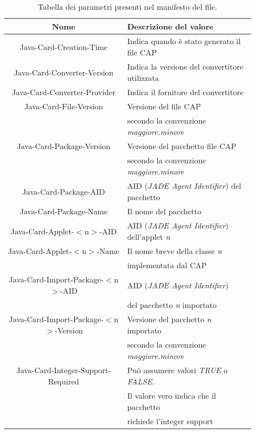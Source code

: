 \begin{table}[h!]
\centering
\begin{tabular}{ |c|l| } 
 \hline
 \textbf{Nome} &  \textbf{Descrizione del valore} \\
 \hline
 Java-Card-Creation-Time &  Indica quando è stato generato il file CAP \\
 \hline
 Java-Card-Converter-Version & Indica la versione del convertitore utilizzata \\ 
 \hline
 Java-Card-Converter-Provider & Indica il fornitore del convertitore \\ 
 \hline
 Java-Card-File-Version & Versione del file CAP \\
  & secondo la convenzione \textit{maggiore.minore} \\ 
 \hline
 Java-Card-Package-Version & Versione del pacchetto file CAP\\
  & secondo la convenzione \textit{maggiore.minore} \\ 
 \hline
 Java-Card-Package-AID & AID (\textit{JADE Agent Identifier}) del pacchetto \\
 \hline
 Java-Card-Package-Name & Il nome del pacchetto \\
 \hline
 Java-Card-Applet-$<$n$>$-AID & AID (\textit{JADE Agent Identifier}) dell'applet \textit{n}\\
 \hline
 Java-Card-Applet-$<$n$>$-Name & Il nome breve della classe \textit{n} \\
  & implementata dal CAP \\
 \hline
 Java-Card-Import-Package-$<$n$>$-AID & AID (\textit{JADE Agent Identifier})\\
  & del pacchetto \textit{n} importato \\
 \hline
 Java-Card-Import-Package-$<$n$>$-Version & Versione del pacchetto \textit{n} importato\\
  & secondo la convenzione \textit{maggiore.minore}\\
 \hline
 Java-Card-Integer-Support-Required & Può assumere valori \textit{TRUE} o \textit{FALSE}.\\
  & Il valore vero indica che il pacchetto\\
   & richiede l'integer support \\
 \hline
 
\end{tabular}
\caption{Tabella dei parametri presenti nel manifesto del file.}
\label{parametri_manifesto}
\end{table}

